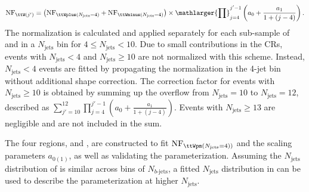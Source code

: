 \documentclass[../thesis.tex]{subfiles}
\begin{document}
\begin{equation}
\label{eq:ttWdd}
\mathrm{NF}_{\ttW(j')} = \left(\mathrm{NF}_{\ttWplus(N_\mathrm{jets}=4)} + \mathrm{NF}_{\ttWminus(N_\mathrm{jets}=4)}\right) \times \mathlarger{\prod}_{j=4}^{j'-1} \left( a_0 + \frac{a_1}{1+(j-4)} \right).
\end{equation}
The normalization is calculated and applied separately for each sub-sample of \ttWplus and \ttWminus in a $N_\mathrm{jets}$ bin for $4\leq N_\mathrm{jets}<10$. Due to small contributions in the \acs{CR}s, events with $N_\mathrm{jets}<4$ and $N_\mathrm{jets}\geq 10$ are not normalized with this scheme. Instead, $N_\mathrm{jets}<4$ events are fitted by propagating the normalization in the 4-jet bin without additional shape correction. The correction factor for \ttW events with $N_\mathrm{jets}\geq 10$ is obtained by summing up the overflow from $N_\mathrm{jets}=10$ to $N_\mathrm{jets}=12$, described as $\sum_{j'=10}^{12} \prod_{j=4}^{j'-1}\left(a_0+\frac{a_1}{1+(j-4)}\right)$. Events with $N_\mathrm{jets}\geq 13$ are negligible and are not included in the sum.

The four regions, \CRttWpm and \CRonebpm, are constructed to fit $\mathrm{NF}_{\ttWpm(N_\mathrm{jets}=4))}$ and the scaling parameters $a_{0(1)}$, as well as validating the parameterization. Assuming the $N_\mathrm{jets}$ distribution of \ttW is similar across bins of $N_{b\text{-jets}}$, a fitted $N_\mathrm{jets}$ distribution in \CRonebpm can be used to describe the \ttW parameterization at higher $N_\mathrm{jets}$.
\end{document}
